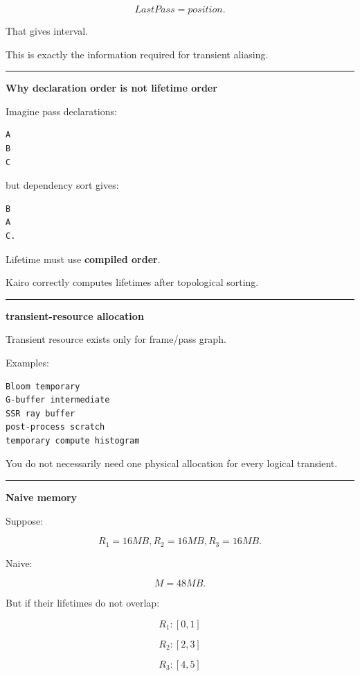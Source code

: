 \[
LastPass=position.
\]

That gives interval.

This is exactly the information required for transient aliasing.

\begin{center}\rule{0.5\linewidth}{0.5pt}\end{center}

\textbf{Why declaration order is not lifetime order}

Imagine pass declarations:

\begin{verbatim}
A
B
C
\end{verbatim}

but dependency sort gives:

\begin{verbatim}
B
A
C.
\end{verbatim}

Lifetime must use \textbf{compiled order}.

Kairo correctly computes lifetimes after topological sorting.

\begin{center}\rule{0.5\linewidth}{0.5pt}\end{center}

\textbf{transient-resource allocation}

Transient resource exists only for frame/pass graph.

Examples:

\begin{verbatim}
Bloom temporary
G-buffer intermediate
SSR ray buffer
post-process scratch
temporary compute histogram
\end{verbatim}

You do not necessarily need one physical allocation for every logical transient.

\begin{center}\rule{0.5\linewidth}{0.5pt}\end{center}

\textbf{Naive memory}

Suppose:

\[
R_1=16MB,
R_2=16MB,
R_3=16MB.
\]

Naive:

\[
M=48MB.
\]

But if their lifetimes do not overlap:

\[
R_1:[0,1]
\]

\[
R_2:[2,3]
\]

\[
R_3:[4,5]
\]

